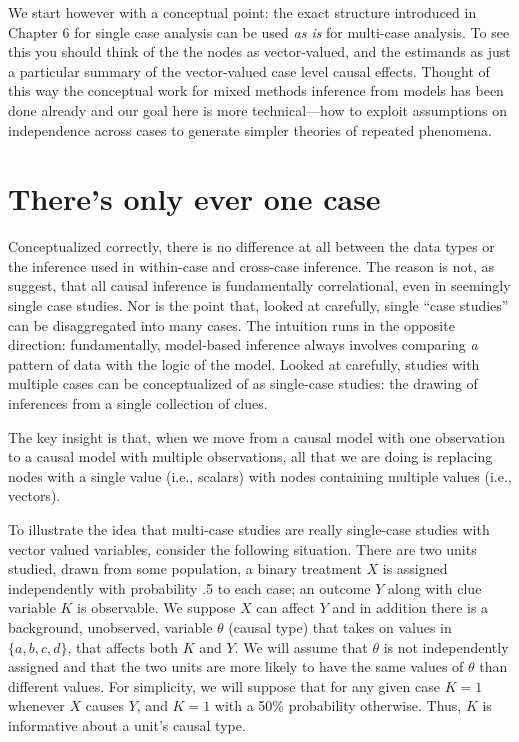 \documentclass[12pt,]{book}
\begin{document}
We start however with a conceptual point: the exact structure introduced in Chapter 6 for single case analysis can be used \emph{as is} for multi-case analysis. To see this you should think of the the nodes as vector-valued, and the estimands as just a particular summary of the vector-valued case level causal effects. Thought of this way the conceptual work for mixed methods inference from models has been done already and our goal here is more technical---how to exploit assumptions on independence across cases to generate simpler theories of repeated phenomena.

\hypertarget{theres-only-ever-one-case}{%
\section{There's only ever one case}\label{theres-only-ever-one-case}}

Conceptualized correctly, there is no difference at all between the data types or the inference used in within-case and cross-case inference. The reason is not, as \citet{king1994designing} suggest, that all causal inference is fundamentally correlational, even in seemingly single case studies. Nor is the point that, looked at carefully, single ``case studies'' can be disaggregated into many cases. The intuition runs in the opposite direction: fundamentally, model-based inference always involves comparing \emph{a} pattern of data with the logic of the model. Looked at carefully, studies with multiple cases can be conceptualized of as single-case studies: the drawing of inferences from a single collection of clues.

The key insight is that, when we move from a causal model with one observation to a causal model with multiple observations, all that we are doing is replacing nodes with a single value (i.e., scalars) with nodes containing multiple values (i.e., vectors).

To illustrate the idea that multi-case studies are really single-case studies with vector valued variables, consider the following situation. There are two units studied, drawn from some population, a binary treatment \(X\) is assigned independently with probability .5 to each case; an outcome \(Y\) along with clue variable \(K\) is observable. We suppose \(X\) can affect \(Y\) and in addition there is a background, unobserved, variable \(\theta\) (causal type) that takes on values in \(\{a,b,c,d\}\), that affects both \(K\) and \(Y\). We will assume that \(\theta\) is not independently assigned and that the two units are more likely to have the same values of \(\theta\) than different values. For simplicity, we will suppose that for any given case \(K=1\) whenever \(X\) causes \(Y\), and \(K=1\) with a 50\% probability otherwise. Thus, \(K\) is informative about a unit's causal type.
\end{document}
